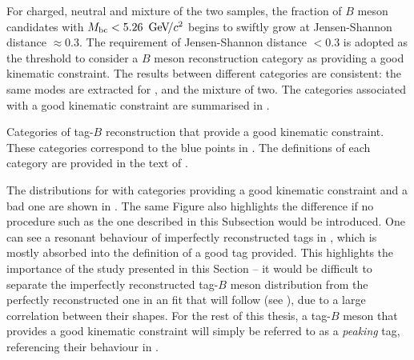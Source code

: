 For charged, neutral and mixture of the two samples, the fraction of $B$ meson candidates with ${M_{\mathrm{bc}}}<5.26~{\mathrm{\,Ge\kern -0.1em V\!/}c^2}$ begins to swiftly grow at Jensen-Shannon distance $\approx0.3$.
The requirement of Jensen-Shannon distance $<0.3$ is adopted as the threshold to consider a $B$ meson reconstruction category as providing a good kinematic constraint.
The results between different categories are consistent: the same modes are extracted for \Bp, \Bz and the mixture of two.
The categories associated with a good kinematic constraint are summarised in .
\begin{table}[hbtp!]
    \centering
    \caption{\label{tab:error_codes}Categories of tag-$B$ reconstruction that provide a good kinematic constraint.
    These categories correspond to the blue points in .
    The definitions of each category are provided in the text of .
    }
    
\end{table}


The \Mbc distributions for \BtoXsgamma with categories providing a good kinematic constraint and a bad one are shown in .
The same Figure also highlights the difference if no procedure such as the one described in this Subsection would be introduced.
One can see a resonant behaviour of imperfectly reconstructed tags in , which is mostly absorbed into the definition of a good tag provided.
This highlights the importance of the study presented in this Section -- it would be difficult to separate the imperfectly reconstructed tag-$B$ meson distribution from the perfectly reconstructed one in an \Mbc fit that will follow (see ), due to a large correlation between their shapes.
For the rest of this thesis, a tag-$B$ meson that provides a good kinematic constraint will simply be referred to as a \textit{peaking} tag, referencing their behaviour in \Mbc.

